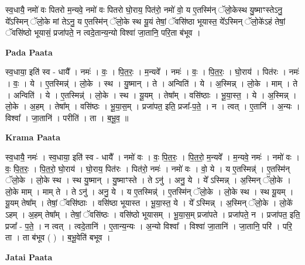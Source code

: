 \documentclass[17pt]{extarticle}
\begin{document}
स्व॒धायै॒ नमो॑ वः पितरो म॒न्यवे॒ नमो॑ वः पितरो घो॒राय॒ पित॑रो॒ नमो॑ वो॒ य ए॒तस्मि॑न् ॅलो॒केस्थ यु॒ष्माꣳस्तेऽनु॒ ये᳚ऽस्मिन् ॅलो॒के मां तेऽनु॒ य ए॒तस्मि॑न् ॅलो॒के स्थ यू॒यं तेषां॒ ॅवसि॑ष्ठा भूयास्त॒ ये᳚ऽस्मिन् ॅलो॒के॑ऽहं तेषां॒ ॅवसि॑ष्ठो भूयासं॒ प्रजा॑पते॒ न त्वदे॒तान्य॒न्यो विश्वा॑ जा॒तानि॒ परि॒ता ब॑भूव । \newline

\textbf{Pada Paata} \newline

स्व॒धाया॒ इति॑ स्व - धायै᳚ । नमः॑ । वः॒ । पि॒त॒रः॒ । म॒न्यवे᳚ । नमः॑ । वः॒ । पि॒त॒रः॒ । घो॒राय॑ । पित॑रः । नमः॑ । वः॒ । ये । ए॒तस्मिन्न्॑ । लो॒के । स्थ । यु॒ष्मान् । ते । अन्विति॑ । ये । अ॒स्मिन्न् । लो॒के । माम् । ते । अन्विति॑ । ये । ए॒तस्मिन्न्॑ । लो॒के । स्थ । यू॒यम् । तेषा᳚म् । वसि॑ष्ठाः । भू॒या॒स्त॒ । ये । अ॒स्मिन्न् । लो॒के । अ॒हम् । तेषा᳚म् । वसि॑ष्ठः । भू॒या॒स॒म् । प्रजा॑पत॒ इति॒ प्रजा᳚-प॒ते॒ । न । त्वत् । ए॒तानि॑ । अ॒न्यः । विश्वा᳚ । जा॒तानि॑ । परीति॑ । ता । ब॒भू॒व॒ ॥  \newline


\textbf{Krama Paata} \newline

स्व॒धायै॒ नमः॑ । स्व॒धाया॒ इति॑ स्व - धायै᳚ । नमो॑ वः । वः॒ पि॒त॒रः॒ । पि॒त॒रो॒ म॒न्यवे᳚ । म॒न्यवे॒ नमः॑ । नमो॑ वः । वः॒ पि॒त॒रः॒ । पि॒त॒रो॒ घो॒राय॑ । घो॒राय॒ पित॑रः । पित॑रो॒ नमः॑ । नमो॑ वः । वो॒ ये । य ए॒तस्मिन्न्॑ । ए॒तस्मि॑न् ॅलो॒के । लो॒के स्थ । स्थ यु॒ष्मान् । यु॒ष्माꣳस्ते । ते ऽनु॑ । अनु॒ ये । ये᳚ ऽस्मिन्न् । अ॒स्मिन् ॅलो॒के । लो॒के माम् । माम् ते । ते ऽनु॑ । अनु॒ ये । य ए॒तस्मिन्न्॑ । ए॒तस्मि॑न् ॅलो॒के । लो॒के स्थ । स्थ यू॒यम् । यू॒यम् तेषा᳚म् । तेषां॒ ॅवसि॑ष्ठाः । वसि॑ष्ठा भूयास्त । भू॒या॒स्त॒ ये । ये᳚ ऽस्मिन्न् । अ॒स्मिन् ॅलो॒के । लो॒के॑ ऽहम् । अ॒हम् तेषा᳚म् । तेषां॒ ॅवसि॑ष्ठः । वसि॑ष्ठो भूयासम् । भू॒या॒स॒म् प्रजा॑पते । प्रजा॑पते॒ न । प्रजा॑पत॒ इति॒ प्रजा᳚ - प॒ते॒ । न त्वत् । त्वदे॒तानि॑ । ए॒तान्य॒न्यः । अ॒न्यो विश्वा᳚ । विश्वा॑ जा॒तानि॑ । जा॒तानि॒ परि॑ । परि॒ ता । ता ब॑भूव ( ) । ब॒भू॒वेति॑ बभूव । \newline

\textbf{Jatai Paata} \newline
\end{document}
